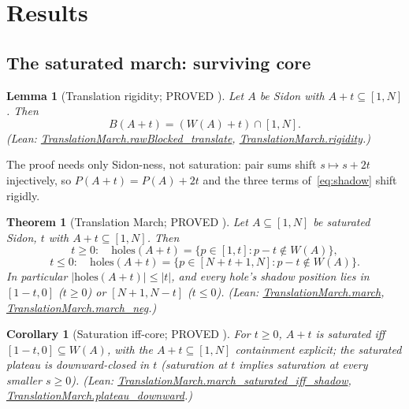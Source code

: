 \documentclass[11pt,a4paper]{article}
\newtheorem{theorem}{Theorem}
\newtheorem{lemma}{Lemma}
\newtheorem{corollary}{Corollary}
\theoremstyle{definition}
\begin{document}
\section{Results}

\subsection{The saturated march: surviving core}
\label{sec:satmarch}

\begin{lemma}[Translation rigidity; PROVED \cite{D234}]
  \label{lem:rigidity}
  Let $A$ be Sidon with $A+t\subseteq[1,N]$. Then
  \begin{equation}
    \label{eq:rigidity}
    B(A+t)=(W(A)+t)\cap[1,N].
  \end{equation}
  (Lean: \url{TranslationMarch.rawBlocked_translate},
  \url{TranslationMarch.rigidity}.)
\end{lemma}
\noindent The proof needs only Sidon-ness, not saturation: pair sums
shift $s\mapsto s+2t$ injectively, so
$P(A+t)=P(A)+2t$ and the three terms of~\eqref{eq:shadow} shift rigidly.

\begin{theorem}[Translation March; PROVED \cite{D234}]
  \label{thm:march}
  Let $A\subseteq[1,N]$ be saturated Sidon, $t$ with
  $A+t\subseteq[1,N]$. Then
  \begin{equation}
    \label{eq:marchpos}
    t\ge0:\quad \mathrm{holes}(A+t)=\{p\in[1,t]:p-t\notin W(A)\},
  \end{equation}
  \begin{equation}
    \label{eq:marchneg}
    t\le0:\quad \mathrm{holes}(A+t)=\{p\in[N+t+1,N]:p-t\notin W(A)\}.
  \end{equation}
  In particular $|\mathrm{holes}(A+t)|\le|t|$, and every hole's shadow
  position lies in $[1-t,0]$ ($t\ge0$) or $[N+1,N-t]$ ($t\le0$).
  (Lean: \url{TranslationMarch.march},
  \url{TranslationMarch.march_neg}.)
\end{theorem}

\begin{corollary}[Saturation iff-core; PROVED \cite{D234}]
  \label{cor:iffcore}
  For $t\ge0$, $A+t$ is saturated iff $[1-t,0]\subseteq W(A)$, with the
  $A+t\subseteq[1,N]$ containment explicit; the saturated plateau is
  downward-closed in $t$ (saturation at $t$ implies saturation at every
  smaller $s\ge0$).
  (Lean: \url{TranslationMarch.march_saturated_iff_shadow},
  \url{TranslationMarch.plateau_downward}.)
\end{corollary}
\end{document}
